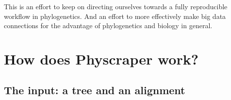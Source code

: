\documentclass[]{article}
\begin{document}
This is an effort to keep on directing ourselves towards a fully reproducible workflow in phylogenetics.
And an effort to more effectively make big data connections for the advantage of phylogenetics and biology in general.

\hypertarget{how-does-physcraper-work}{%
\section{How does Physcraper work?}\label{how-does-physcraper-work}}

\hypertarget{the-input-a-tree-and-an-alignment}{%
\subsection{The input: a tree and an alignment}\label{the-input-a-tree-and-an-alignment}}
\end{document}
